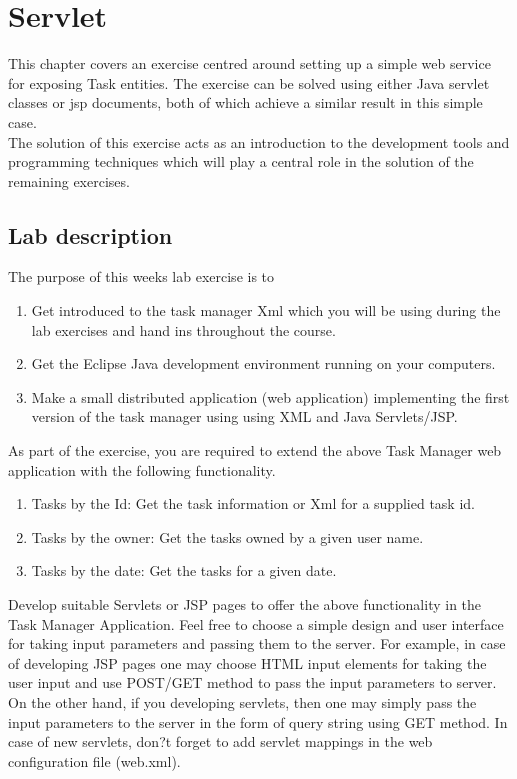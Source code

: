 	\chapter{Servlet}
	\minitoc
	This chapter covers an exercise centred around setting up a simple web service for exposing Task entities. The exercise can be solved using either Java servlet classes or jsp documents, both of which achieve a similar result in this simple case.\\
	The solution of this exercise acts as an introduction to the development tools and programming techniques which will play a central role in the solution of the remaining exercises.
	
	\section{Lab description}
	\label{servlet_description}
	The purpose of this weeks lab exercise is to
	\begin{enumerate}
	    \item Get introduced to the task manager Xml which you will be using during the lab exercises and hand ins throughout the course.
	    \item Get the Eclipse Java development environment running on your computers.
	    \item Make a small distributed application (web application) implementing the first version of the task manager using using XML and Java Servlets/JSP.
	\end{enumerate}
	As part of the exercise, you are required to extend the above Task Manager web application with the following functionality.
	\begin{enumerate}
	    \item Tasks by the Id: Get the task information or Xml for a supplied task id.
	    \item Tasks by the owner: Get the tasks owned by a given user name.
	    \item Tasks by the date: Get the tasks for a given date.
	\end{enumerate}
	Develop suitable Servlets or JSP pages to offer the above functionality in the Task Manager Application. Feel free to choose a simple design and user interface for taking input parameters and passing them to the server. For example, in case of developing JSP pages one may choose HTML input elements for taking the user input and use POST/GET method to pass the input parameters to server. On the other hand, if you developing servlets, then one may simply pass the input parameters to the server in the form of query string using GET method. In case of new servlets, don?t forget to add servlet mappings in the web configuration file (web.xml).
	
